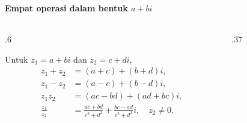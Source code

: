 \documentclass{../../kalkulus-ppt}
\begin{document}
\begin{frame}
    \frametitle{\insertsection}
    \framesubtitle{Empat operasi dalam bentuk $a+bi$}
    \begin{columns}[c,onlytextwidth]
        \begin{column}{.6\textwidth}
            \begin{definisi}
                Untuk $z_1=a+bi$ dan $z_2=c+di$,
                \[
                    \begin{aligned}
                        z_1+z_2&=(a+c)+(b+d)i,\\
                        z_1-z_2&=(a-c)+(b-d)i,\\
                        z_1z_2&=(ac-bd)+(ad+bc)i,\\
                        \frac{z_1}{z_2}&=\frac{ac+bd}{c^2+d^2}
                        +\frac{bc-ad}{c^2+d^2}i,\quad z_2\ne0.
                    \end{aligned}
                \]
            \end{definisi}
        \end{column}
        \begin{column}{.37\textwidth}
        \end{column}
    \end{columns}
\end{frame}
\end{document}
